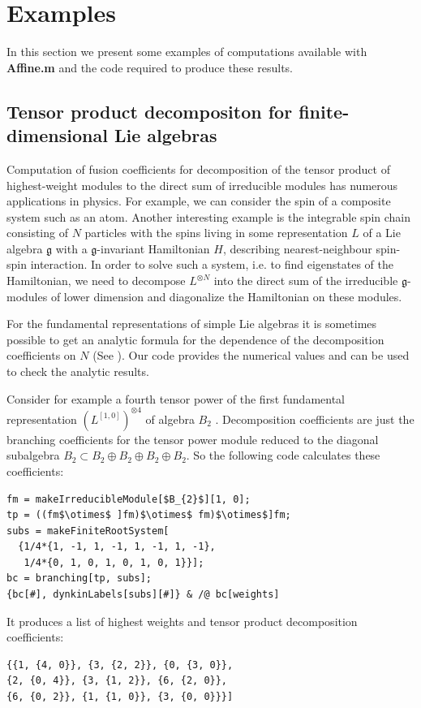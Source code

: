 \documentclass[preprint,12pt]{elsarticle}
\newcommand{\gf}{\mathfrak{g}}
\begin{document}
\section{Examples}
\label{sec:examples}
In this section we present some examples of computations available with {\bf Affine.m} and the code required to produce these results.

\subsection{Tensor product decompositon for finite-dimensional Lie algebras}
\label{sec:tens-prod-decomp}

Computation of fusion coefficients for decomposition of the tensor product of highest-weight modules to the direct sum of irreducible modules has numerous applications in physics. For example, we can consider the spin of a composite system such as an atom. Another interesting example is the integrable spin chain consisting of $N$ particles with the spins living in some representation $L$ of a Lie algebra $\gf$ with a $\gf$-invariant Hamiltonian $H$, describing nearest-neighbour spin-spin interaction. In order to solve such a system, i.e. to find eigenstates of the Hamiltonian, we need to decompose $L^{\otimes N}$ into the direct sum of the irreducible $\gf$-modules of lower dimension and diagonalize the Hamiltonian on these modules.

For the fundamental representations of simple Lie algebras it is sometimes possible to get an analytic formula for the dependence of the decomposition coefficients on $N$ (See \cite{LyakhovskyPostnova2011}). Our code provides the numerical values and can be used to check the analytic results.

Consider for example a fourth tensor power of the first fundamental representation $\left(L^{[1,0]}\right)^{\otimes 4}$ of algebra $B_{2}$ . Decomposition coefficients are just the branching
 coefficients for the tensor power module reduced to the diagonal subalgebra $B_{2}\subset B_{2}\oplus B_{2}\oplus B_{2}\oplus B_{2}$. So the following code calculates these coefficients:
\begin{lstlisting}[mathescape=true]
fm = makeIrreducibleModule[$B_{2}$][1, 0];
tp = ((fm$\otimes$ ]fm)$\otimes$ fm)$\otimes$]fm;
subs = makeFiniteRootSystem[
  {1/4*{1, -1, 1, -1, 1, -1, 1, -1}, 
   1/4*{0, 1, 0, 1, 0, 1, 0, 1}}];
bc = branching[tp, subs];
{bc[#], dynkinLabels[subs][#]} & /@ bc[weights]
\end{lstlisting}
It produces a list of highest weights and tensor product decomposition coefficients:
\begin{lstlisting}
{{1, {4, 0}}, {3, {2, 2}}, {0, {3, 0}}, 
{2, {0, 4}}, {3, {1, 2}}, {6, {2, 0}}, 
{6, {0, 2}}, {1, {1, 0}}, {3, {0, 0}}}]
\end{lstlisting}
\end{document}
